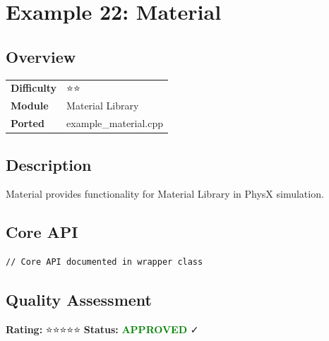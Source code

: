 \section{Example 22: Material}
\subsection{Overview}
\begin{table}[h]
\centering
\begin{tabular}{|l|l|}
\hline
\textbf{Difficulty} & ⭐⭐ \\
\textbf{Module} & Material Library \\
\textbf{Ported} & example\_material.cpp \\
\hline
\end{tabular}
\end{table}

\subsection{Description}
Material provides functionality for Material Library in PhysX simulation.

\subsection{Core API}
\begin{lstlisting}
// Core API documented in wrapper class
\end{lstlisting}

\subsection{Quality Assessment}
\textbf{Rating:} ⭐⭐⭐⭐⭐ \quad \textbf{Status:} \textcolor{green}{\textbf{APPROVED}} ✓
